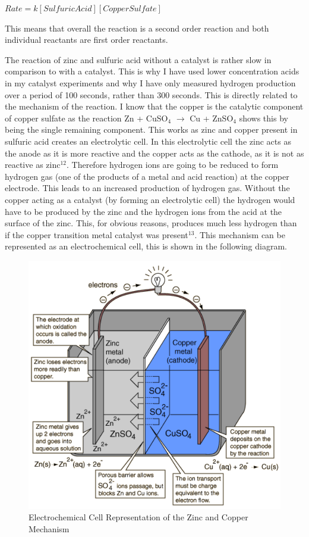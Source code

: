 $Rate = k [Sulfuric Acid] [Copper Sulfate]$

This means that overall the reaction is a second order reaction and both individual reactants are first order reactants.






The reaction of zinc and sulfuric acid without a catalyst is rather slow in comparison to with a catalyst. This is why I have used lower concentration acids in my catalyst experiments and why I have only measured hydrogen production over a period of 100 seconds, rather than 300 seconds. This is directly related to the mechanism of the reaction. I know that the copper is the catalytic component of copper sulfate as the reaction Zn + CuSO$_4$ $\rightarrow$ Cu + ZnSO$_4$ shows this by being the single remaining component. This works as zinc and copper present in sulfuric acid creates an electrolytic cell. In this electrolytic cell the zinc acts as the anode as it is more reactive and the copper acts as the cathode, as it is not as reactive as zinc$^{12}$. Therefore hydrogen ions are going to be reduced to form hydrogen gas (one of the products of a metal and acid reaction) at the copper electrode. This leads to an increased production of hydrogen gas. Without the copper acting as a catalyst (by forming an electrolytic cell) the hydrogen would have to be produced by the zinc and the hydrogen ions from the acid at the surface of the zinc. This, for obvious reasons, produces much less hydrogen than if the copper transition metal catalyst was present$^{13}$. This mechanism can be represented as an electrochemical cell, this is shown in the following diagram. 

\begin{figure}[H]
    \includegraphics[width=\textwidth]{./Analysis/Images/ElectrochemicalCell.png}
    \caption{Electrochemical Cell Representation of the Zinc and Copper Mechanism} \label{fig:ZincCopperCell}
\end{figure}

